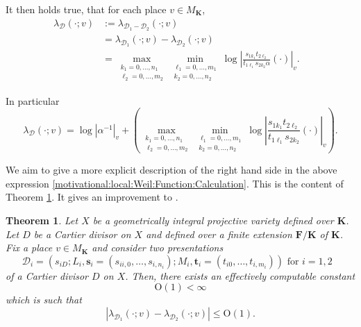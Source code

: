 \documentclass[10pt]{amsart}
\renewcommand{\leq}{\leqslant}
\newcommand{\KK}{\mathbf{K}}
\newcommand{\FF}{\mathbf{F}}
\newtheorem{theorem}{Theorem}[section]
\theoremstyle{definition}
\numberwithin{equation}{section}
\begin{document}
It then holds true, that for each place
$
v \in M_{\KK}  
$, 
\begin{align*}
\lambda_{\mathcal{D}}(\cdot;v) & := \lambda_{\mathcal{D}_1 - \mathcal{D}_2}(\cdot;v) & \\
&= \lambda_{\mathcal{D}_1}(\cdot;v) - \lambda_{\mathcal{D}_2}(\cdot;v) \\
& = \max_{\substack{k_1 = 0,\dots,n_1 \\
\ell_2 = 0,\dots,m_2}} \min_{\substack{\ell_1 = 0,\dots,m_1 \\ k_2 = 0,\dots,n_2}} \log \left| \frac{s_{1 {k_1}} t_{2 {\ell_2}}}{  t_{1{ \ell_1}} s_{2 {k_2}} \alpha} (\cdot) \right|_v \text{.}
\end{align*}

In particular 
\begin{equation}\label{motivational:local:Weil:Function:Calculation}
\lambda_{\mathcal{D}}(\cdot;v) = \log |\alpha^{-1}|_v + \left( \max_{\substack{k_1 = 0,\dots,n_1 \\
\ell_2 = 0,\dots,m_2}} \min_{\substack{\ell_1 = 0,\dots,m_1 \\ k_2 = 0,\dots,n_2}} \log \left| \frac{s_{1 {k_1}} t_{2 {\ell_2}}  }{  t_{1 {\ell_1}} s_{2 {k_2}}  }(\cdot) \right|_v \right) \text{.}
\end{equation}

We aim to give a more explicit description of the right hand side in the above expression \eqref{motivational:local:Weil:Function:Calculation}.  This is the content of Theorem \ref{explicit:local:weil:constant}.  It gives an improvement to \cite[Theorem 2.2.11]{Bombieri:Gubler}.

\begin{theorem}\label{explicit:local:weil:constant}
Let $X$ be a geometrically integral projective variety defined over $\KK$.
Let $D$ be a Cartier divisor on $X$ and defined over a finite extension $\FF / \KK$ of $\KK$.
  Fix a place $v \in M_{\KK}$ and consider two presentations
  $$
\mathcal{D}_i = (s_{iD}; L_i,\mathbf{s}_i = (s_{ii,0},\dots,s_{i,n_i}); M_i, \mathbf{t}_i = (t_{i0},\dots,t_{i,m_i})) \text{ for $i = 1,2$ }
$$
of a Cartier divisor $D$ on $X$.  Then, there exists an effectively computable constant 
$$\mathrm{O}(1) < \infty$$ 
which is such that
$$
|\lambda_{\mathcal{D}_1}(\cdot;v) - \lambda_{\mathcal{D}_2}(\cdot;v)| \leq \mathrm{O}(1) \text{.}
$$
\end{theorem}
\end{document}
